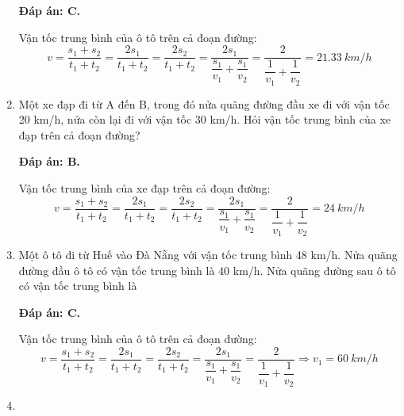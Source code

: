 \begin{enumerate}[label=\bfseries Câu \arabic*:]
	\loigiai
	{\textbf{Đáp án: C.}	
		
	Vận tốc trung bình của ô tô trên cả đoạn đường:
$$v=\dfrac{s_1+s_2}{t_1+t_2} = \dfrac{2s_1}{t_1+t_2} = \dfrac{2s_2}{t_1+t_2} = \dfrac{2s_1}{\dfrac{s_1}{v_1}+\dfrac{s_1}{v_2}} = \dfrac{2}{\dfrac{1}{v_1}+\dfrac{1}{v_2}} = \SI{21.33}{km/h}$$
		
	}
	\item {}
	
	\cauhoi
	{Một xe đạp đi từ A đến B, trong đó nửa quãng đường đầu xe đi với vận tốc 20 km/h, nửa còn lại đi với vận tốc 30 km/h. Hỏi vận tốc trung bình của xe đạp trên cả đoạn đường?
		
		
	}
	
	\loigiai
	{\textbf{Đáp án: B.}
		
			Vận tốc trung bình của xe đạp trên cả đoạn đường:
		$$v=\dfrac{s_1+s_2}{t_1+t_2} = \dfrac{2s_1}{t_1+t_2} = \dfrac{2s_2}{t_1+t_2} = \dfrac{2s_1}{\dfrac{s_1}{v_1}+\dfrac{s_1}{v_2}} = \dfrac{2}{\dfrac{1}{v_1}+\dfrac{1}{v_2}} = \SI{24}{km/h}$$
		
	}
	\item {}
	
	\cauhoi
	{Một ô tô đi từ Huế vào Đà Nẵng với vận tốc trung bình 48 km/h. Nửa quãng đường đầu ô tô có vận tốc trung bình là 40 km/h. Nửa quãng đường sau ô tô có vận tốc trung bình là
		
		
	}
	
	\loigiai
	{\textbf{Đáp án: C.}
		
		Vận tốc trung bình của ô tô trên cả đoạn đường:
	$$v=\dfrac{s_1+s_2}{t_1+t_2} = \dfrac{2s_1}{t_1+t_2} = \dfrac{2s_2}{t_1+t_2} = \dfrac{2s_1}{\dfrac{s_1}{v_1}+\dfrac{s_1}{v_2}} = \dfrac{2}{\dfrac{1}{v_1}+\dfrac{1}{v_2}} \Rightarrow v_1 = \SI{60}{km/h}$$
	}
	\item {}


\end{enumerate}
